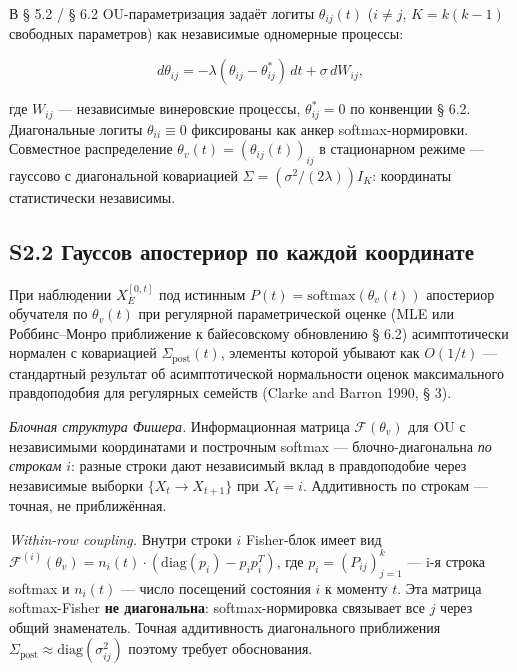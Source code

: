 \documentclass[pdflatex,sn-mathphys-ay]{sn-jnl}
\begin{document}
В § 5.2 / § 6.2 OU-параметризация задаёт логиты \(\theta_{ij}(t)\) (\(i \ne j\), \(K = k(k-1)\) свободных параметров) как независимые одномерные процессы:



\begin{equation}d\theta_{ij} = -\lambda(\theta_{ij} - \theta_{ij}^*)\, dt + \sigma\, dW_{ij}, \tag{S2.1}\end{equation}



где \(W_{ij}\) --- независимые винеровские процессы, \(\theta_{ij}^* = 0\) по конвенции § 6.2. Диагональные логиты \(\theta_{ii} \equiv 0\) фиксированы как анкер softmax-нормировки. Совместное распределение \(\theta_v(t) = (\theta_{ij}(t))_{ij}\) в стационарном режиме --- гауссово с диагональной ковариацией \(\Sigma = (\sigma^2/(2\lambda)) I_K\): координаты статистически независимы.



\subsection*{S2.2 Гауссов апостериор по каждой координате}\label{s2.2-ux433ux430ux443ux441ux441ux43eux432-ux430ux43fux43eux441ux442ux435ux440ux438ux43eux440-ux43fux43e-ux43aux430ux436ux434ux43eux439-ux43aux43eux43eux440ux434ux438ux43dux430ux442ux435}



При наблюдении \(X_E^{[0,t]}\) под истинным \(P(t) = \text{softmax}(\theta_v(t))\) апостериор обучателя по \(\theta_v(t)\) при регулярной параметрической оценке (MLE или Роббинс--Монро приближение к байесовскому обновлению § 6.2) асимптотически нормален с ковариацией \(\Sigma_{\text{post}}(t)\), элементы которой убывают как \(O(1/t)\) --- стандартный результат об асимптотической нормальности оценок максимального правдоподобия для регулярных семейств (Clarke and Barron 1990, § 3).



\emph{Блочная структура Фишера.} Информационная матрица \(\mathcal{F}(\theta_v)\) для OU с независимыми координатами и построчным softmax --- блочно-диагональна \emph{по строкам} \(i\): разные строки дают независимый вклад в правдоподобие через независимые выборки \(\{X_t \to X_{t+1}\}\) при \(X_t = i\). Аддитивность по строкам --- точная, не приближённая.



\emph{Within-row coupling.} Внутри строки \(i\) Fisher-блок имеет вид \(\mathcal{F}^{(i)}(\theta_v) = n_i(t) \cdot (\text{diag}(p_i) - p_i p_i^T)\), где \(p_i = (P_{ij})_{j=1}^k\) --- i-я строка softmax и \(n_i(t)\) --- число посещений состояния \(i\) к моменту \(t\). Эта матрица softmax-Fisher \textbf{не диагональна}: softmax-нормировка связывает все \(j\) через общий знаменатель. Точная аддитивность диагонального приближения \(\Sigma_{\text{post}} \approx \text{diag}(\sigma_{ij}^2)\) поэтому требует обоснования.
\end{document}
